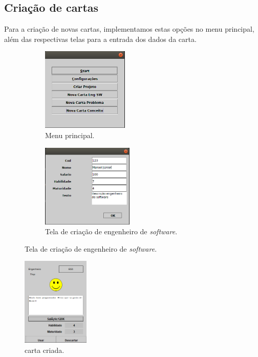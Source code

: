 \documentclass[11pt]{article}
\begin{document}
\subsection{Criação de cartas}
\label{sec:orgd6be45d}
Para a criação de novas cartas, implementamos estas opções no menu principal, além das
respectivas telas para a entrada dos dados da carta.
\begin{figure}[h] \centering
\begin{subfigure}[t]{0.45\textwidth} \centering
\includegraphics[height=150px]{./img/start.png}
\captionsetup{labelformat=empty} \caption{Menu principal.}
\end{subfigure}
\begin{subfigure}[t]{0.45\textwidth} \centering
\includegraphics[height=150px]{./img/mcard.png}
\captionsetup{labelformat=empty} \caption{Tela de criação de engenheiro de \textit{software}.}
\end{subfigure}
\end{figure}
\begin{figure}[H]
\centering
\includegraphics[height=160px]{./img/ccard.png}
\caption{carta criada.}
\end{figure} 
\end{document}
